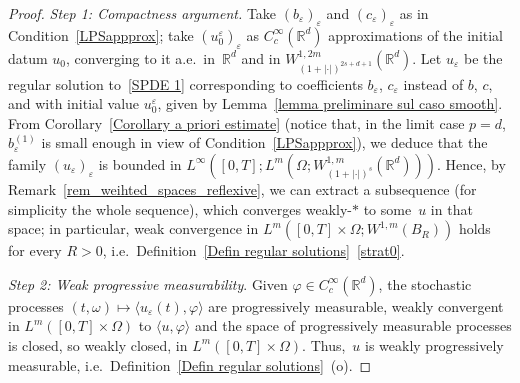 \documentclass[a4paper,10pt]{article}
\newcommand\1{\mathbbm{1}}
\newcommand{\eps}{\varepsilon}
\numberwithin{equation}{section}
\begin{document}
\begin{proof}
\emph{Step 1: Compactness argument.} Take $(b_\eps)_\eps$ and $(c_\eps)_\eps$ as in Condition~\ref{LPSappprox}; take $(u_0^\eps)_\eps$ as $C^\infty_c(\mathbb{R}^d)$ approximations of the initial datum $u_0$, converging to it a.e.~in~$\mathbb{R}^d$ and in $W_{(1+|\cdot|)^{2s+d+1}}^{1,2m}(\mathbb{R}^d)$. Let $u_\eps$ be the regular solution to~\eqref{SPDE 1} corresponding to coefficients $b_\eps$, $c_\eps$ instead of $b$, $c$, and with initial value $u_0^\eps$, given by Lemma~\ref{lemma preliminare sul caso smooth}. From Corollary~\ref{Corollary a priori estimate} (notice that, in the limit case $p=d$, $b_\eps^{(1)}$ is small enough in view of Condition~\ref{LPSappprox}), we deduce that the family $(u_\eps)_\eps$ is bounded in $L^\infty([0,T];L^m(\Omega;W^{1,m}_{(1+|\cdot|)^{s}}(\mathbb{R}^d)))$. Hence, by Remark~\ref{rem_weihted_spaces_reflexive}, we can extract a subsequence (for simplicity the whole sequence), which converges weakly-$*$ to some~$u$ in that space; in particular, weak convergence in $L^m([0,T]\times\Omega;W^{1,m}(B_R))$ holds for every $R>0$, i.e.~Definition~\ref{Defin regular solutions}~\ref{strat0}.

\emph{Step 2: Weak progressive measurability}. Given $\varphi\in C_{c}^{\infty}(\mathbb{R}^{d})$, the stochastic processes $(t,\omega) \mapsto \langle u_{\eps}(t),\varphi\rangle$ are progressively measurable, weakly convergent in $L^{m}([0,T]\times\Omega)$ to $\langle u,\varphi\rangle$ and the space of progressively measurable processes is closed, so weakly closed, in $L^{m}([0,T]\times\Omega)$. Thus,~$u$ is weakly progressively measurable, i.e.~Definition~\ref{Defin regular solutions}~(o).


\end{proof}
\end{document}

